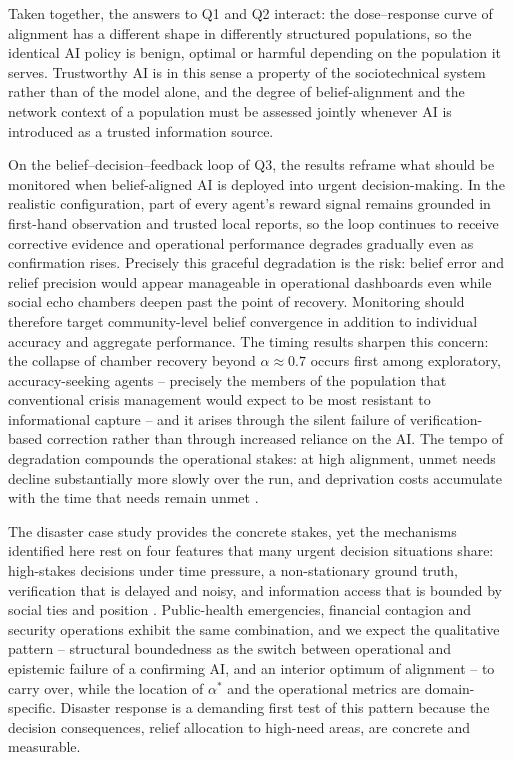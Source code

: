 \documentclass[pdflatex,sn-basic]{sn-jnl}
\begin{document}
Taken together, the answers to Q1 and Q2 interact: the dose--response curve of alignment has a different shape in differently structured populations, so the identical AI policy is benign, optimal or harmful depending on the population it serves. Trustworthy AI is in this sense a property of the sociotechnical system rather than of the model alone, and the degree of belief-alignment and the network context of a population must be assessed jointly whenever AI is introduced as a trusted information source.

On the belief--decision--feedback loop of Q3, the results reframe what should be monitored when belief-aligned AI is deployed into urgent decision-making. In the realistic configuration, part of every agent's reward signal remains grounded in first-hand observation and trusted local reports, so the loop continues to receive corrective evidence and operational performance degrades gradually even as confirmation rises. Precisely this graceful degradation is the risk: belief error and relief precision would appear manageable in operational dashboards even while social echo chambers deepen past the point of recovery. Monitoring should therefore target community-level belief convergence in addition to individual accuracy and aggregate performance. The timing results sharpen this concern: the collapse of chamber recovery beyond $\alpha \approx 0.7$ occurs first among exploratory, accuracy-seeking agents -- precisely the members of the population that conventional crisis management would expect to be most resistant to informational capture \citep{comes2020coordination} -- and it arises through the silent failure of verification-based correction rather than through increased reliance on the AI. The tempo of degradation compounds the operational stakes: at high alignment, unmet needs decline substantially more slowly over the run, and deprivation costs accumulate with the time that needs remain unmet \citep{holguin2012unique}.

The disaster case study provides the concrete stakes, yet the mechanisms identified here rest on four features that many urgent decision situations share: high-stakes decisions under time pressure, a non-stationary ground truth, verification that is delayed and noisy, and information access that is bounded by social ties and position \citep{svenson1993time,mendonca2001decision,holguin2012unique}. Public-health emergencies, financial contagion and security operations exhibit the same combination, and we expect the qualitative pattern -- structural boundedness as the switch between operational and epistemic failure of a confirming AI, and an interior optimum of alignment -- to carry over, while the location of $\alpha^{*}$ and the operational metrics are domain-specific. Disaster response is a demanding first test of this pattern because the decision consequences, relief allocation to high-need areas, are concrete and measurable.
\end{document}
